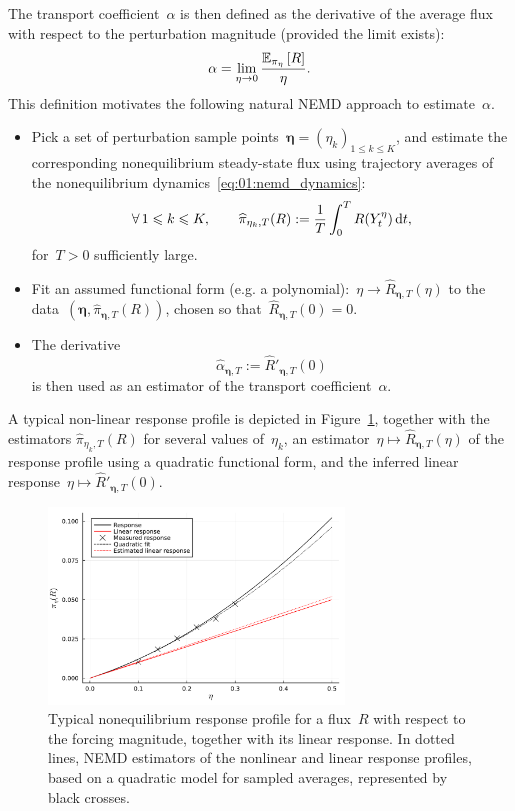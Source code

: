 The transport coefficient~$\alpha$ is then defined as the derivative of the average flux with respect to the perturbation magnitude (provided the limit exists):
\begin{equation}
    \label{eq:01:linear_response}
    \alpha=\underset{\eta\to 0}{\lim}\,\frac{\mathbb{E}_{\pi_\eta}\left[R\right]}{\eta}.
\end{equation}
This definition motivates the following natural NEMD approach to estimate~$\alpha$.
\begin{itemize}
    \item{Pick a set of perturbation sample points~$\boldsymbol{\eta}=(\eta_k)_{1\leq k\leq K}$, and estimate the corresponding nonequilibrium steady-state flux using trajectory averages of the nonequilibrium dynamics~\eqref{eq:01:nemd_dynamics}:
    \begin{equation}
        \forall\,1\leqslant k\leqslant K,\qquad\widehat{\pi}_{\eta_k,T}(R) := \frac1{T}\int_{0}^T R(Y_t^\eta)\,\mathrm{d} t,
    \end{equation}
    for~$T>0$ sufficiently large.
    }
    \item{Fit an assumed functional form (e.g. a polynomial):~$\eta\to \widehat{R}_{\boldsymbol{\eta},T}(\eta)$ to the data~$\left(\boldsymbol{\eta},\widehat{\pi}_{\boldsymbol{\eta},T}(R)\right)$, chosen so that~$\widehat{R}_{\boldsymbol{\eta},T}(0)=0$.}
    \item{The derivative
    \begin{equation}
     \widehat{\alpha}_{\boldsymbol{\eta},T} := \widehat{R}'_{\boldsymbol{\eta},T}(0) 
    \end{equation}
    is then used as an estimator of the transport coefficient~$\alpha$.
    }
\end{itemize}
A typical non-linear response profile is depicted in Figure~\ref{fig:01:linear_response}, together with the estimators $\widehat{\pi}_{\eta_k,T}(R)$ for several values of~$\eta_k$, an estimator~$\eta\mapsto\widehat{R}_{\boldsymbol{\eta},T}(\eta)$ of the response profile using a quadratic functional form, and the inferred linear response~$\eta\mapsto \widehat{R}'_{\boldsymbol{\eta},T}(0)$.

\begin{figure}
    \centering
    \includegraphics[width=0.7\textwidth]{figures/01/linear_response.pdf}
    \caption{Typical nonequilibrium response profile for a flux~$R$ with respect to the forcing magnitude, together with its linear response. In dotted lines, NEMD estimators of the nonlinear and linear response profiles, based on a quadratic model for sampled averages, represented by black crosses.}
    \label{fig:01:linear_response}
\end{figure}

